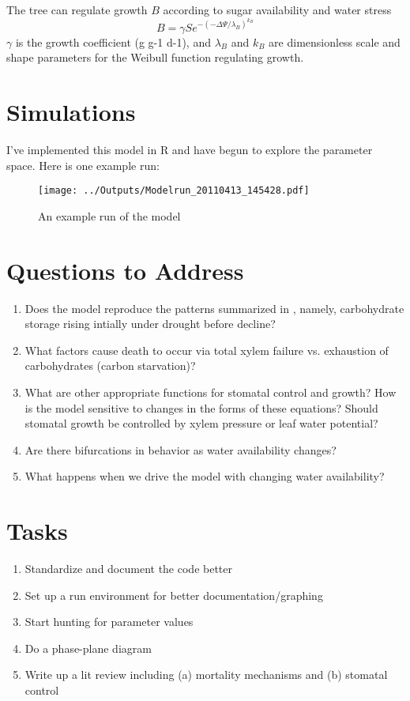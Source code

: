 \documentclass[12pt]{amsart}
\begin{document}
The tree can regulate growth $B$ according to sugar availability and water stress
 \begin{equation}\label{B}
 B = \gamma S e^{-(-\Delta\Psi/\lambda_B)^{k_B}}
\end{equation}
$\gamma$ is the growth coefficient (g g-1 d-1), and $\lambda_B$ and $k_B$ are dimensionless scale and shape parameters for the Weibull function regulating growth.   
 
\section{Simulations}
I've implemented this model in R and have begun to explore the parameter space.  Here is one example run:

\begin{figure}[H]
\begin{center}
\texttt{[image: ../Outputs/Modelrun\_20110413\_145428.pdf]}
\caption{An example run of the model}
\label{example1}
\end{center}
\end{figure}


\section{Questions to Address}
 
\begin{enumerate}
  \item Does the model reproduce the patterns summarized in \citet{McDowell2011}, namely, carbohydrate storage rising intially under drought before decline?
  \item What factors cause death to occur via total xylem failure vs. exhaustion of carbohydrates (carbon starvation)?
  \item What are other appropriate functions for stomatal control and growth?  How is the model sensitive to changes in the forms of these equations?  Should stomatal growth be controlled by xylem pressure or leaf water potential?
  \item Are there bifurcations in behavior as water availability changes?
  \item What happens when we drive the model with changing water availability?
\end{enumerate}
  
\section{Tasks}
\begin{enumerate}
  \item Standardize and document the code better
  \item Set up a run environment for better documentation/graphing
  \item Start hunting for parameter values
  \item Do a phase-plane diagram
  \item Write up a lit review including (a) mortality mechanisms and (b) stomatal control
\end{enumerate}



\end{document}
